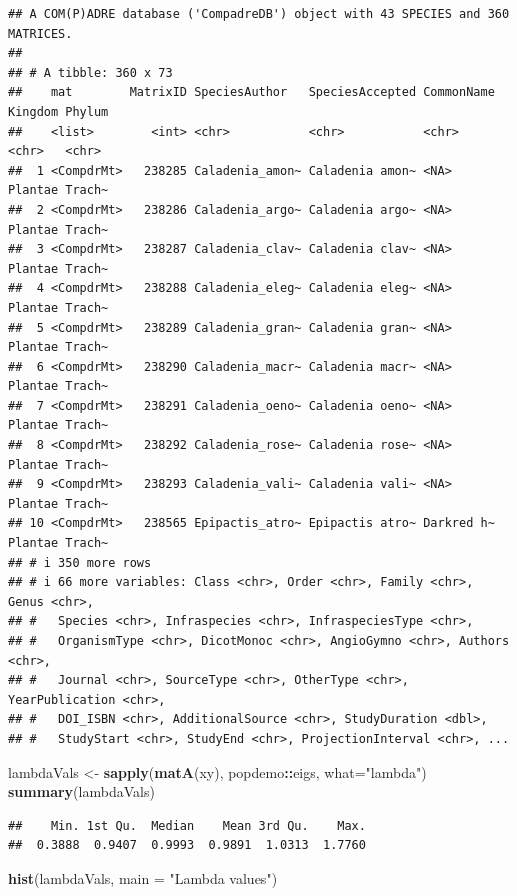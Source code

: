 \documentclass[
]{book}
\newenvironment{Shaded}{\begin{snugshade}}{\end{snugshade}}
\newcommand{\AttributeTok}[1]{\textcolor[rgb]{0.13,0.29,0.53}{#1}}
\newcommand{\FunctionTok}[1]{\textcolor[rgb]{0.13,0.29,0.53}{\textbf{#1}}}
\newcommand{\NormalTok}[1]{#1}
\newcommand{\OtherTok}[1]{\textcolor[rgb]{0.56,0.35,0.01}{#1}}
\newcommand{\SpecialCharTok}[1]{\textcolor[rgb]{0.81,0.36,0.00}{\textbf{#1}}}
\newcommand{\StringTok}[1]{\textcolor[rgb]{0.31,0.60,0.02}{#1}}
\theoremstyle{definition}
\theoremstyle{definition}
\theoremstyle{definition}
\theoremstyle{definition}
\theoremstyle{remark}
\begin{document}
\begin{verbatim}
## A COM(P)ADRE database ('CompadreDB') object with 43 SPECIES and 360 MATRICES.
## 
## # A tibble: 360 x 73
##    mat        MatrixID SpeciesAuthor   SpeciesAccepted CommonName Kingdom Phylum
##    <list>        <int> <chr>           <chr>           <chr>      <chr>   <chr> 
##  1 <CompdrMt>   238285 Caladenia_amon~ Caladenia amon~ <NA>       Plantae Trach~
##  2 <CompdrMt>   238286 Caladenia_argo~ Caladenia argo~ <NA>       Plantae Trach~
##  3 <CompdrMt>   238287 Caladenia_clav~ Caladenia clav~ <NA>       Plantae Trach~
##  4 <CompdrMt>   238288 Caladenia_eleg~ Caladenia eleg~ <NA>       Plantae Trach~
##  5 <CompdrMt>   238289 Caladenia_gran~ Caladenia gran~ <NA>       Plantae Trach~
##  6 <CompdrMt>   238290 Caladenia_macr~ Caladenia macr~ <NA>       Plantae Trach~
##  7 <CompdrMt>   238291 Caladenia_oeno~ Caladenia oeno~ <NA>       Plantae Trach~
##  8 <CompdrMt>   238292 Caladenia_rose~ Caladenia rose~ <NA>       Plantae Trach~
##  9 <CompdrMt>   238293 Caladenia_vali~ Caladenia vali~ <NA>       Plantae Trach~
## 10 <CompdrMt>   238565 Epipactis_atro~ Epipactis atro~ Darkred h~ Plantae Trach~
## # i 350 more rows
## # i 66 more variables: Class <chr>, Order <chr>, Family <chr>, Genus <chr>,
## #   Species <chr>, Infraspecies <chr>, InfraspeciesType <chr>,
## #   OrganismType <chr>, DicotMonoc <chr>, AngioGymno <chr>, Authors <chr>,
## #   Journal <chr>, SourceType <chr>, OtherType <chr>, YearPublication <chr>,
## #   DOI_ISBN <chr>, AdditionalSource <chr>, StudyDuration <dbl>,
## #   StudyStart <chr>, StudyEnd <chr>, ProjectionInterval <chr>, ...
\end{verbatim}

\begin{Shaded}
\begin{Highlighting}[]
\NormalTok{lambdaVals }\OtherTok{\textless{}{-}} \FunctionTok{sapply}\NormalTok{(}\FunctionTok{matA}\NormalTok{(xy), popdemo}\SpecialCharTok{::}\NormalTok{eigs, }\AttributeTok{what=}\StringTok{"lambda"}\NormalTok{)}
\FunctionTok{summary}\NormalTok{(lambdaVals)}
\end{Highlighting}
\end{Shaded}

\begin{verbatim}
##    Min. 1st Qu.  Median    Mean 3rd Qu.    Max. 
##  0.3888  0.9407  0.9993  0.9891  1.0313  1.7760
\end{verbatim}

\begin{Shaded}
\begin{Highlighting}[]
\FunctionTok{hist}\NormalTok{(lambdaVals, }\AttributeTok{main =} \StringTok{"Lambda values"}\NormalTok{)}
\end{Highlighting}
\end{Shaded}
\end{document}
